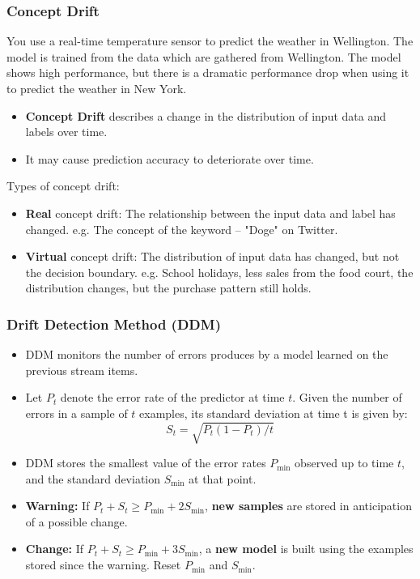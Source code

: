 \documentclass[aspectratio=169, 10pt]{beamer}
\begin{document}
\begin{frame}
    \frametitle{Concept Drift}
    \begin{example}
        You use a real-time temperature sensor to predict the weather in Wellington.
        The model is trained from the data which are gathered from Wellington. The model shows high performance, 
        but there is a dramatic performance drop when using it to predict the weather in New York.
    \end{example}

    \begin{itemize}
        \item \textbf{Concept Drift} describes a change in the distribution of input data and labels over time.
        \item It may cause prediction accuracy to deteriorate over time.
    \end{itemize}
    
    Types of concept drift:
    \begin{itemize}
        \item \textbf{Real} concept drift: The relationship between the input data and label has changed. e.g. The concept of the keyword -- "Doge" on Twitter.
        \item \textbf{Virtual} concept drift: The distribution of input data has changed, but not the decision boundary. e.g. School holidays, less sales from the food court, the distribution changes, but the purchase pattern still holds.
    \end{itemize}
\end{frame}

\begin{frame}
    \frametitle{Drift Detection Method (DDM)}
    
    \begin{itemize}
        \item DDM monitors the number of errors produces by a model learned on the previous stream items.
        \item Let $P_t$ denote the error rate of the predictor at time $t$. 
        Given the number of errors in a sample of $t$ examples, its standard deviation at time t is given by:
        \[
            S_t = \sqrt{P_t(1-P_t)/t}
        \]
        \item DDM stores the smallest value of the error rates $P_{\text{min}}$ observed up to time $t$, and the standard deviation $S_{\text{min}}$ at that point.
        \item \textbf{Warning:} If $P_t + S_t \geq P_{\text{min}} + 2 S_{\text{min}}$, \textbf{new samples} are stored in anticipation of a possible change.
        \item \textbf{Change:} If $P_t + S_t  \geq P_{\text{min}} + 3 S_{\text{min}}$, a \textbf{new model} is built using the examples stored since the warning. Reset $P_{\text{min}}$ and $S_{\text{min}}$.
    \end{itemize}
\end{frame}
\end{document}
